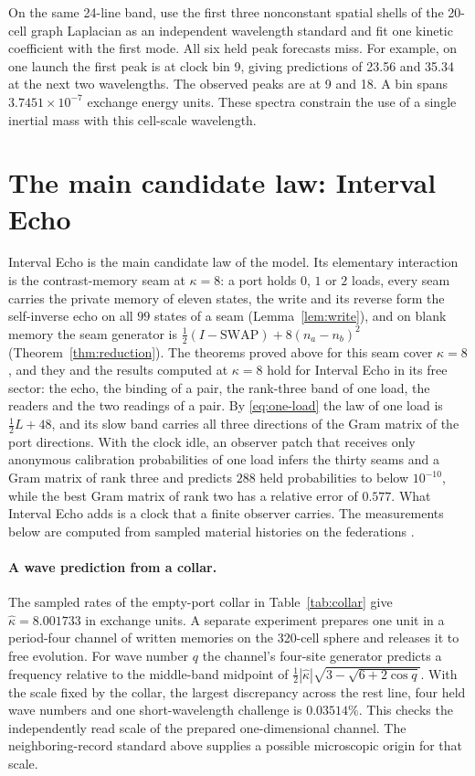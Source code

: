 \documentclass[11pt]{article}
\theoremstyle{definition}
\theoremstyle{remark}
\theoremstyle{plain}
\newcommand{\SWAP}{\mathrm{SWAP}}
\begin{document}
On the same 24-line band, use the first three nonconstant spatial shells
of the 20-cell graph Laplacian as an independent wavelength standard and fit
one kinetic coefficient with the first mode. All six held peak forecasts
miss. For example, on one launch the first peak is at clock bin 9,
giving predictions of 23.56 and 35.34 at the next two wavelengths.
The observed peaks are at 9 and 18. A bin spans
$3.7451\times10^{-7}$ exchange energy units. These spectra constrain
the use of a single inertial mass with this cell-scale wavelength.

\section{The main candidate law: Interval Echo}
\label{sec:echo}

Interval Echo is the main candidate law of the model. Its elementary
interaction is the contrast-memory seam at $\kappa=8$: a port holds $0$,
$1$ or $2$ loads, every seam carries the private memory of eleven states,
the write and its reverse form the self-inverse echo on all $99$ states of
a seam (Lemma~\ref{lem:write}), and on blank memory the seam generator is
$\tfrac12(I-\SWAP)+8(n_a-n_b)^2$ (Theorem~\ref{thm:reduction}). The
theorems proved above for this seam cover $\kappa=8$, and they and the
results computed at $\kappa=8$ hold for Interval Echo in its free sector:
the echo, the binding of a pair, the rank-three band of one load, the
readers and the two readings of a pair. By \eqref{eq:one-load} the law of
one load is $\tfrac12L+48$, and its slow band carries all three directions
of the Gram matrix of the port directions. With the clock idle, an observer
patch that receives only anonymous calibration probabilities of one load
infers the thirty seams and a Gram matrix of rank three and predicts $288$
held probabilities to below $10^{-10}$, while the best Gram matrix of rank
two has a relative error of $0.577$. What Interval Echo adds is a clock
that a finite observer carries. The measurements below are computed from
sampled material histories on the federations \cite{ophrepo}.

\paragraph{A wave prediction from a collar.}
The sampled rates of the empty-port collar in Table~\ref{tab:collar}
give $\widehat\kappa=8.001733$ in exchange units. A separate experiment
prepares one unit in a period-four channel of written memories on the
320-cell sphere and releases it to free evolution. For wave number $q$
the channel's four-site generator predicts a frequency relative to the
middle-band midpoint of
$\tfrac12|\widehat\kappa|\sqrt{3-\sqrt{6+2\cos q}}$.
With the scale fixed by the collar, the largest discrepancy across the
rest line, four held wave numbers and one short-wavelength challenge is
$0.03514\%$. This checks the independently read scale of the prepared
one-dimensional channel. The neighboring-record standard above supplies
a possible microscopic origin for that scale.
\end{document}
